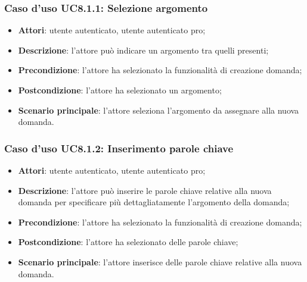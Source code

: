 	\subsubsection{Caso d'uso UC8.1.1: Selezione argomento}
	\begin{itemize}
		\item
			\textbf{Attori}: utente autenticato, utente autenticato pro;
		\item
			\textbf{Descrizione}: l'attore può indicare un argomento tra quelli presenti;
		\item		
			\textbf{Precondizione}: l'attore ha selezionato la funzionalità di creazione domanda;
		\item
			\textbf{Postcondizione}: l'attore ha selezionato un argomento;
		\item
			\textbf{Scenario principale}: l'attore seleziona l'argomento da assegnare alla nuova domanda.		
	\end{itemize}
		
	\subsubsection{Caso d'uso UC8.1.2: Inserimento parole chiave}
	\begin{itemize}
		\item
			\textbf{Attori}: utente autenticato, utente autenticato pro;
		\item
			\textbf{Descrizione}: l'attore può inserire le parole chiave relative alla nuova domanda per specificare più dettagliatamente l'argomento della domanda;
		\item		
			\textbf{Precondizione}: l'attore ha selezionato la funzionalità di creazione domanda;
		\item
			\textbf{Postcondizione}: l'attore ha selezionato delle parole chiave;
		\item
			\textbf{Scenario principale}: l'attore inserisce delle parole chiave relative alla nuova domanda.	
	\end{itemize}


